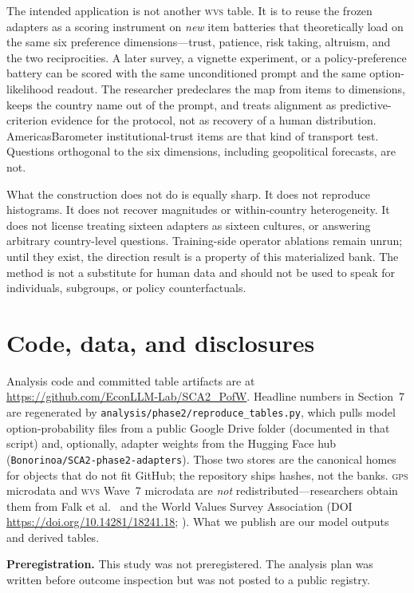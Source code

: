 \documentclass[10pt,letterpaper]{article}
\newcommand{\WVS}{\textsc{wvs}}
\newcommand{\GPS}{\textsc{gps}}
\begin{document}
The intended application is not another \WVS{} table. It is to reuse the frozen adapters as a scoring instrument on \emph{new} item batteries that theoretically load on the same six preference dimensions---trust, patience, risk taking, altruism, and the two reciprocities. A later survey, a vignette experiment, or a policy-preference battery can be scored with the same unconditioned prompt and the same option-likelihood readout. The researcher predeclares the map from items to dimensions, keeps the country name out of the prompt, and treats alignment as predictive-criterion evidence for the protocol, not as recovery of a human distribution. AmericasBarometer institutional-trust items are that kind of transport test. Questions orthogonal to the six dimensions, including geopolitical forecasts, are not.

What the construction does not do is equally sharp. It does not reproduce histograms. It does not recover magnitudes or within-country heterogeneity. It does not license treating sixteen adapters as sixteen cultures, or answering arbitrary country-level questions. Training-side operator ablations remain unrun; until they exist, the direction result is a property of this materialized bank. The method is not a substitute for human data and should not be used to speak for individuals, subgroups, or policy counterfactuals.


\section*{Code, data, and disclosures}
Analysis code and committed table artifacts are at \url{https://github.com/EconLLM-Lab/SCA2_PofW}. Headline numbers in Section~7 are regenerated by \texttt{analysis/phase2/reproduce\_tables.py}, which pulls model option-probability files from a public Google Drive folder (documented in that script) and, optionally, adapter weights from the Hugging Face hub (\texttt{Bonorinoa/SCA2-phase2-adapters}). Those two stores are the canonical homes for objects that do not fit GitHub; the repository ships hashes, not the banks. \GPS{} microdata and \WVS{} Wave~7 microdata are \emph{not} redistributed---researchers obtain them from Falk et al.\ \cite{falk2018} and the World Values Survey Association (DOI \url{https://doi.org/10.14281/18241.18}; \cite{wvs2022}). What we publish are our model outputs and derived tables.

\noindent\textbf{Preregistration.} This study was not preregistered. The analysis plan was written before outcome inspection but was not posted to a public registry.
\end{document}

